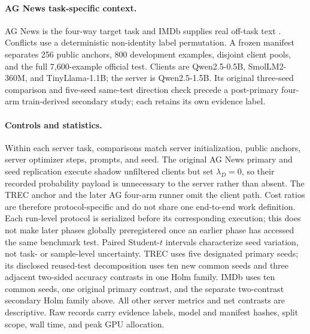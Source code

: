 \documentclass[letterpaper]{article}
\begin{document}
\paragraph{AG News task-specific context.}
AG News is the four-way target task and IMDb supplies real off-task text
\cite{zhang2015agnews,maas2011imdb}.  Conflicts use a deterministic
non-identity label permutation.  A frozen manifest separates 256 public
anchors, 800 development examples, disjoint client pools, and the full
7,600-example official test.  Clients are Qwen2.5-0.5B, SmolLM2-360M, and
TinyLlama-1.1B; the server is Qwen2.5-1.5B.  Its original three-seed comparison
and five-seed same-test direction check precede a post-primary four-arm
train-derived secondary study; each retains its own evidence label.

\paragraph{Controls and statistics.}
Within each server task, comparisons match server initialization, public
anchors, server optimizer steps, prompts, and seed.  The original AG News
primary and seed replication execute shadow unfiltered clients but set
\(\lambda_D=0\), so their recorded probability payload is unnecessary to the
server rather than absent.  The TREC anchor and the later AG four-arm runner
omit the client path.  Cost ratios are therefore protocol-specific and do not
share one end-to-end work definition.  Each run-level protocol is serialized
before its corresponding execution; this does not make later phases globally
preregistered once an earlier phase has accessed the same benchmark test.
Paired Student-\(t\) intervals characterize seed variation, not task- or
sample-level uncertainty.  TREC uses five designated primary seeds; its
disclosed reused-test decomposition uses ten new common seeds and three
adjacent two-sided accuracy contrasts in one Holm family.  IMDb uses ten common
seeds, one original primary contrast, and the separate two-contrast secondary
Holm family above.  All other server metrics and net contrasts are
descriptive.  Raw records carry evidence labels, model and manifest hashes,
split scope, wall time, and peak GPU allocation.
\end{document}
